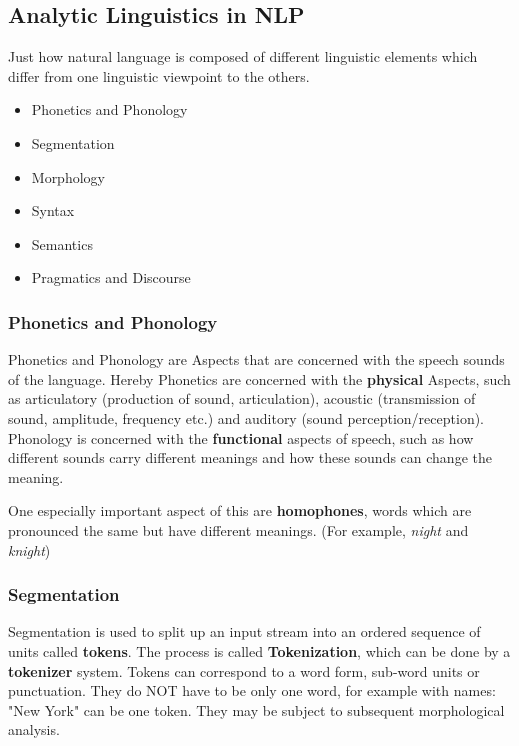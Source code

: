 \documentclass[
../../NLP4W_Summary.tex,
]
{subfiles}
\begin{document}
\subsection{Analytic Linguistics in NLP}
Just how natural language is composed of different linguistic elements which differ from one linguistic viewpoint to the others.

\begin{defbox}
    \begin{itemize}
        \item Phonetics and Phonology
        \item Segmentation
        \item Morphology
        \item Syntax
        \item Semantics
        \item Pragmatics and Discourse
    \end{itemize}
\end{defbox}

\subsubsection{Phonetics and Phonology}
Phonetics and Phonology are Aspects that are concerned with the speech sounds of the language.
Hereby Phonetics are concerned with the \textbf{physical} Aspects, such as articulatory (production of sound, articulation), acoustic (transmission of sound, amplitude, frequency etc.) and auditory (sound perception/reception).
Phonology is concerned with the \textbf{functional} aspects of speech, such as how different sounds carry different meanings and how these sounds can change the meaning.

One especially important aspect of this are \textbf{homophones}, words which are pronounced the same but have different meanings. (For example, \textit{night} and \textit{knight})

\subsubsection{Segmentation}
Segmentation is used to split up an input stream into an ordered sequence of units called \textbf{tokens}. The process is called \textbf{Tokenization}, which can be done by a \textbf{tokenizer} system.
Tokens can correspond to a word form, sub-word units or punctuation. 
They do NOT have to be only one word, for example with names: "New York" can be one token.
They may be subject to subsequent morphological analysis.
\end{document}
